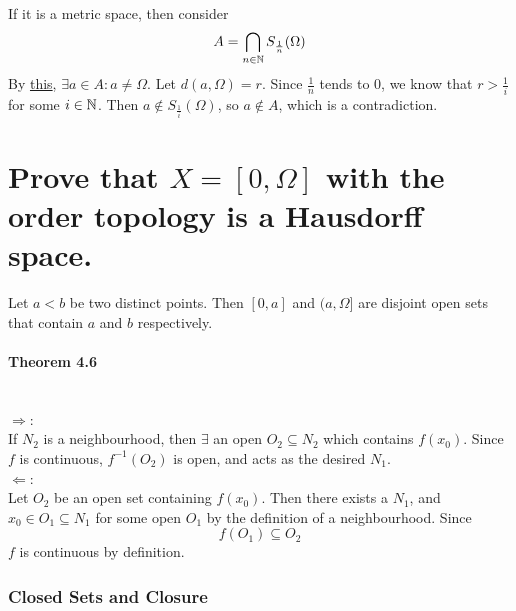 \begin{parts}
\begin{solution}
 \\If it is a metric space, then consider
 $$A = \bigcap_{n \in \mathbb{N}} S_{\frac{1}{n}}(\Omega)$$
 By \hyperref[supp]{this}, $\exists a \in A: a \neq \Omega$. Let $d(a, \Omega) = r$. Since $\frac{1}{n}$ tends to 0, we know that $r > \frac{1}{i}$ for some $i \in \mathbb{N}$. Then $a \notin S_{\frac{1}{i}}(\Omega)$, so $a \notin A$, which is a contradiction.
\end{solution}

\part{Prove that $X = [0, \Omega]$ with the order topology is a Hausdorff space.}

\begin{solution}
 Let $a < b$ be two distinct points. Then $[0, a]$ and $(a, \Omega]$ are disjoint open sets that contain $a$ and $b$ respectively.
\end{solution}

\end{parts}

\subsection{Theorem 4.6}
\setcounter{question}{0}


\begin{solution}
 \\$\Rightarrow$: \\
 If $N_2$ is a neighbourhood, then $\exists$ an open $O_2 \subseteq N_2$ which contains $f(x_0)$. Since $f$ is continuous, $f^{-1}(O_2)$ is open, and acts as the desired $N_1$. \\
 $\Leftarrow$: \\
 Let $O_2$ be an open set containing $f(x_0)$. Then there exists a $N_1$, and $x_0 \in O_1 \subseteq N_1$ for some open $O_1$ by the definition of a neighbourhood. Since
 $$f(O_1) \subseteq O_2$$
 $f$ is continuous by definition.
\end{solution}

\section{Closed Sets and Closure}
